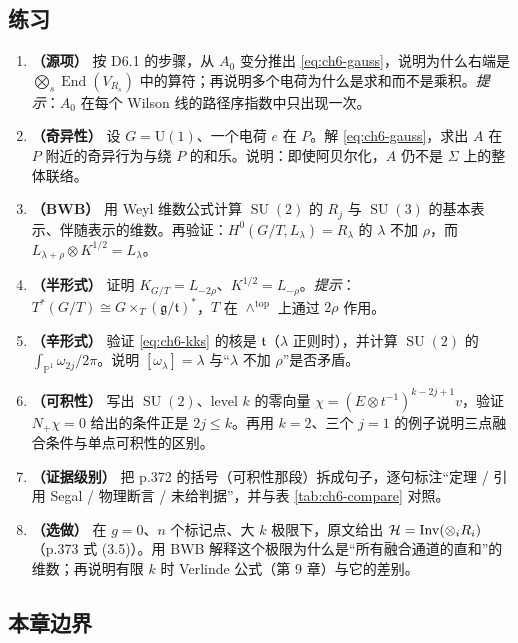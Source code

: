 \subsection{练习}
\label{sec:ch6-exercises}

\begin{enumerate}[leftmargin=1.8em,itemsep=3pt]
\item \textbf{（源项）} 按 D6.1 的步骤，从 $A_0$ 变分推出 \eqref{eq:ch6-gauss}，说明为什么右端是 $\bigotimes_s\operatorname{End}(V_{R_s})$ 中的算符；再说明多个电荷为什么是求和而不是乘积。\emph{提示}：$A_0$ 在每个 Wilson 线的路径序指数中只出现一次。
\item \textbf{（奇异性）} 设 $G=\mathrm U(1)$、一个电荷 $e$ 在 $P$。解 \eqref{eq:ch6-gauss}，求出 $A$ 在 $P$ 附近的奇异行为与绕 $P$ 的和乐。说明：即使阿贝尔化，$A$ 仍不是 $\Sigma$ 上的整体联络。
\item \textbf{（BWB）} 用 Weyl 维数公式计算 $\operatorname{SU}(2)$ 的 $R_j$ 与 $\operatorname{SU}(3)$ 的基本表示、伴随表示的维数。再验证：$H^0(G/T,L_\lambda)=R_\lambda$ 的 $\lambda$ 不加 $\rho$，而 $L_{\lambda+\rho}\otimes K^{1/2}=L_\lambda$。
\item \textbf{（半形式）} 证明 $K_{G/T}=L_{-2\rho}$、$K^{1/2}=L_{-\rho}$。\emph{提示}：$T^*(G/T)\cong G\times_T(\mathfrak g/\mathfrak t)^*$，$T$ 在 $\wedge^{\mathrm{top}}$ 上通过 $2\rho$ 作用。
\item \textbf{（辛形式）} 验证 \eqref{eq:ch6-kks} 的核是 $\mathfrak t$（$\lambda$ 正则时），并计算 $\operatorname{SU}(2)$ 的 $\int_{\mathbb P^1}\omega_{2j}/2\pi$。说明 $[\omega_\lambda]=\lambda$ 与“$\lambda$ 不加 $\rho$”是否矛盾。
\item \textbf{（可积性）} 写出 $\operatorname{SU}(2)$、level $k$ 的零向量 $\chi=(E\otimes t^{-1})^{k-2j+1}v$，验证 $N_+\chi=0$ 给出的条件正是 $2j\le k$。再用 $k=2$、三个 $j=1$ 的例子说明三点融合条件与单点可积性的区别。
\item \textbf{（证据级别）} 把 p.372 的括号（可积性那段）拆成句子，逐句标注“定理 / 引用 Segal / 物理断言 / 未给判据”，并与表 \ref{tab:ch6-compare} 对照。
\item \textbf{（选做）} 在 $g=0$、$n$ 个标记点、大 $k$ 极限下，原文给出 $\mathcal{H}=\operatorname{Inv}(\otimes_i R_i)$（p.373 式 (3.5)）。用 BWB 解释这个极限为什么是“所有融合通道的直和”的维数；再说明有限 $k$ 时 Verlinde 公式（第 9 章）与它的差别。
\end{enumerate}

\subsection{本章边界}
\label{sec:ch6-boundary}

